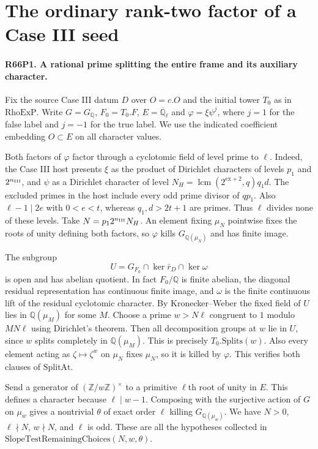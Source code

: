 \section{The ordinary rank-two factor of a Case III seed}

\paragraph{R66P1. A rational prime splitting the entire frame and its auxiliary character.}
Fix the source Case III datum $D$ over $O=c.O$ and the initial
tower $T_0$ as in $\mathrm{RhoExP}$. Write $G=G_{\mathbb Q}$,
$F_0=T_0.F$, $E=\overline{\mathbb Q}_\ell$ and
$\varphi=\xi\psi^j$, where $j=1$ for the false label and
$j=-1$ for the true label. We use the indicated coefficient
embedding $O\subset E$ on all character values.

Both factors of $\varphi$ factor through a cyclotomic field of level
prime to $\ell$. Indeed, the Case III host presents $\xi$ as the
product of Dirichlet characters of levels $p_1$ and
$2^{n_{\rm III}}$, and $\psi$ as a Dirichlet character of level
$N_H=\operatorname{lcm}(2^{\mathrm{ex}+2},q)q_1d$.
The excluded primes in the host include every odd prime divisor of
$qp_1$. Also $\ell-1\mid2e$ with $0<e<t$, whereas
$q_1,d>2t+1$ are primes. Thus $\ell$ divides none of these
levels. Take $N=p_1 2^{n_{\rm III}}N_H$. An element fixing
$\mu_N$ pointwise fixes the roots of unity defining both factors,
so $\varphi$ kills $G_{\mathbb Q(\mu_N)}$ and has finite image.

The subgroup
\[
       U=G_{F_0}\cap\ker\bar r_D\cap\ker\omega
\]
is open and has abelian quotient. In fact $F_0/\mathbb Q$ is
finite abelian, the diagonal residual representation has continuous
finite image, and $\omega$ is the finite continuous lift of the
residual cyclotomic character. By Kronecker--Weber the fixed field
of $U$ lies in $\mathbb Q(\mu_M)$ for some $M$. Choose a prime
$w>N\ell$ congruent to $1$ modulo $MN\ell$ using Dirichlet's
theorem. Then all decomposition groups at $w$ lie in $U$, since
$w$ splits completely in $\mathbb Q(\mu_M)$. This is precisely
$T_0.\mathrm{Splits}(w)$. Also every element acting as
$\zeta\mapsto\zeta^w$ on $\mu_N$ fixes $\mu_N$, so it is
killed by $\varphi$. This verifies both clauses of $\mathrm{SplitAt}$.

Send a generator of $(\mathbb Z/w\mathbb Z)^\times$ to a primitive
$\ell$th root of unity in $E$. This defines a character because
$\ell\mid w-1$. Composing with the surjective action of $G$ on
$\mu_w$ gives a nontrivial $\theta$ of exact order $\ell$ killing
$G_{\mathbb Q(\mu_w)}$. We have $N>0$, $\ell\nmid N$, $w\nmid N$,
and $\ell$ is odd. These are all the hypotheses collected in
$\mathrm{SlopeTestRemainingChoices}(N,w,\theta)$.

